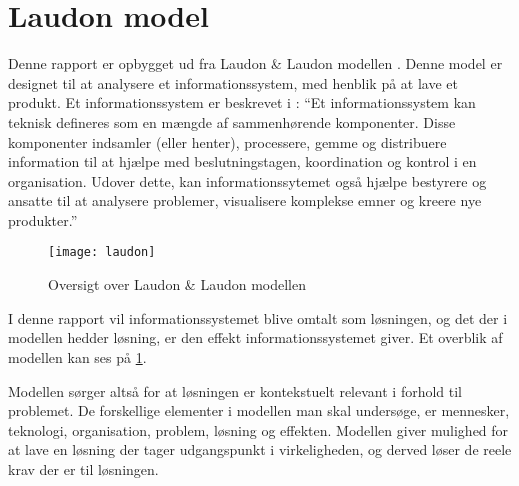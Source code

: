 \section{Laudon model}
Denne rapport er opbygget ud fra Laudon \& Laudon modellen \cite{laudon}. Denne model er designet til at analysere et informationssystem, med henblik på at lave et produkt. Et informationssystem er beskrevet i \cite{laudon2006management}: \enquote{Et informationssystem kan teknisk defineres som en mængde af sammenhørende komponenter. Disse komponenter indsamler (eller henter), processere, gemme og distribuere information til at hjælpe med beslutningstagen, koordination og kontrol i en organisation. Udover dette, kan informationssytemet også hjælpe bestyrere og ansatte til at analysere problemer, visualisere komplekse emner og kreere nye produkter.}

\begin{figure}
	\begin{center}
		\texttt{[image: laudon]}
	\end{center}
	\caption{Oversigt over Laudon \& Laudon modellen}
	\label{fig:oversigt_laudon}
\end{figure}

I denne rapport vil informationssystemet blive omtalt som løsningen, og det der i modellen hedder løsning, er den effekt informationssystemet giver. Et overblik af modellen kan ses på \cref{fig:oversigt_laudon}. 

Modellen sørger altså for at løsningen er kontekstuelt relevant i forhold til problemet. De forskellige elementer i modellen man skal undersøge, er mennesker, teknologi, organisation, problem, løsning og effekten. Modellen giver mulighed for at lave en løsning der tager udgangspunkt i virkeligheden, og derved løser de reele krav der er til løsningen.